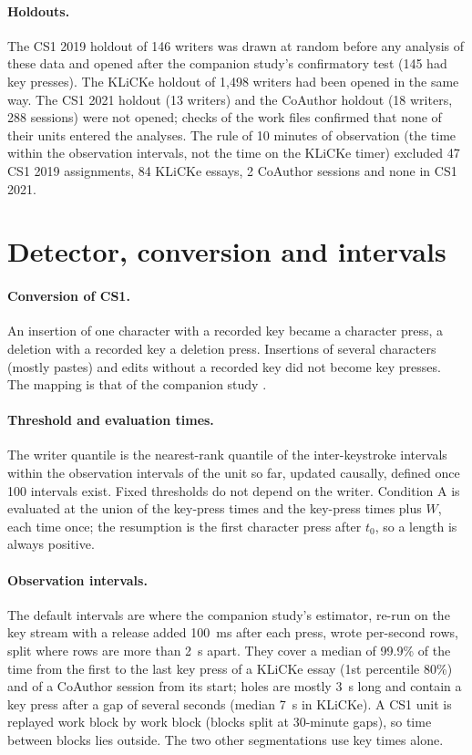 \paragraph{Holdouts.} The CS1 2019 holdout of 146 writers was drawn at random before any analysis of these data and
opened after the companion study's confirmatory test (145 had key presses). The KLiCKe holdout of 1,498 writers had
been opened in the same way. The CS1 2021 holdout (13 writers) and the CoAuthor holdout (18 writers, 288 sessions)
were not opened; checks of the work files confirmed that none of their units entered the analyses. The rule of 10
minutes of observation (the time within the observation intervals, not the time on the KLiCKe timer) excluded 47 CS1
2019 assignments, 84 KLiCKe essays, 2 CoAuthor sessions and none in CS1 2021.

\section{Detector, conversion and intervals}
\label{app:detector}

\paragraph{Conversion of CS1.} An insertion of one character with a recorded key became a character press, a deletion
with a recorded key a deletion press. Insertions of several characters (mostly pastes) and edits without a recorded key
did not become key presses. The mapping is that of the companion study \cite{miura2026runup}.

\paragraph{Threshold and evaluation times.} The writer quantile is the nearest-rank quantile of the inter-keystroke
intervals within the observation intervals of the unit so far, updated causally, defined once 100 intervals exist.
Fixed thresholds do not depend on the writer. Condition A is evaluated at the union of the key-press times and the
key-press times plus $W$, each time once; the resumption is the first character press after $t_0$, so a length is
always positive.

\paragraph{Observation intervals.} The default intervals are where the companion study's estimator, re-run on the key
stream with a release added 100~ms after each press, wrote per-second rows, split where rows are more than 2~s apart.
They cover a median of 99.9\% of the time from the first to the last key press of a KLiCKe essay (1st percentile
80\%) and of a CoAuthor session from its start; holes are mostly 3~s long and contain a key press after a gap of
several seconds (median 7~s in KLiCKe). A CS1 unit is replayed work block by work block (blocks split at 30-minute
gaps), so time between blocks lies outside. The two other segmentations use key times alone.

